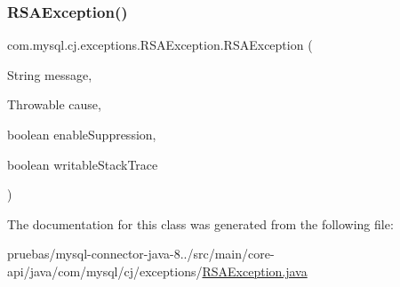 \subsubsection{\texorpdfstring{R\+S\+A\+Exception()}{RSAException()}\hspace{0.1cm}{\footnotesize\ttfamily [5/5]}}
{\footnotesize\ttfamily com.\+mysql.\+cj.\+exceptions.\+R\+S\+A\+Exception.\+R\+S\+A\+Exception (\begin{DoxyParamCaption}\item[{String}]{message,  }\item[{Throwable}]{cause,  }\item[{boolean}]{enable\+Suppression,  }\item[{boolean}]{writable\+Stack\+Trace }\end{DoxyParamCaption})\hspace{0.3cm}{\ttfamily [protected]}}



The documentation for this class was generated from the following file\+:\begin{DoxyCompactItemize}
\item 
pruebas/mysql-\/connector-\/java-\/8../src/main/core-\/api/java/com/mysql/cj/exceptions/\mbox{\hyperlink{_r_s_a_exception_8java}{R\+S\+A\+Exception.\+java}}\end{DoxyCompactItemize}
